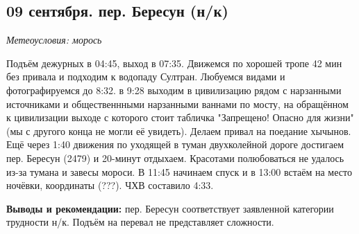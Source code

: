 \subsection{09 сентября. пер. Бересун (н/к)}
\textit{Метеоусловия: морось}


Подъём дежурных в 04:45, выход в 07:35. Движемся по хорошей тропе 42 мин без привала и подходим к водопаду Султран. Любуемся видами и фотографируемся до 8:32. в 9:28 выходим в цивилизацию рядом с нарзанными источниками и общественнными нарзанными ваннами по мосту, на обращённом к цивилизации выходе с которого стоит табличка "Запрещено! Опасно для жизни" (мы с другого конца не могли её увидеть). Делаем привал на поедание хычынов. Ещё через 1:40 движения по уходящей в туман двухколейной дороге достигаем пер. Бересун (2479) и 20-минут отдыхаем. Красотами полюбоваться не удалось из-за тумана и завесы мороси. В 11:45 начинаем спуск и в 13:00 встаём на место ночёвки, координаты (???). ЧХВ составило 4:33.

\textbf{Выводы и рекомендации:} пер. Бересун соответствует заявленной категории трудности н/к.  Подъём на перевал не представляет сложности. 

\clearpage
